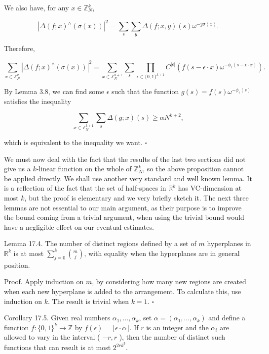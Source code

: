 \documentclass[10pt]{article}
\begin{document}
We also have, for any $x \in \mathbb{Z}_{N}^{k}$,

$$
\left|\Delta(f ; x)^{\wedge}(\sigma(x))\right|^{2}=\sum_{s} \sum_{y} \Delta(f ; x, y)(s) \omega^{-y \sigma(x)} .
$$

Therefore,

$$
\sum_{x \in \mathbb{Z}_{N}^{k}}\left|\Delta(f ; x)^{\wedge}(\sigma(x))\right|^{2}=\sum_{x \in \mathbb{Z}_{N}^{k+1}} \sum_{s} \prod_{\epsilon \in\{0,1\}^{k+1}} C^{|\epsilon|}\left(f(s-\epsilon \cdot x) \omega^{-\phi_{\epsilon}(s-\epsilon \cdot x)}\right) .
$$

By Lemma 3.8, we can find some $\epsilon$ such that the function $g(s)=f(s) \omega^{-\phi_{\epsilon}(s)}$ satisfies the inequality

$$
\sum_{x \in \mathbb{Z}_{N}^{k+1}} \sum_{s} \Delta(g ; x)(s) \geqslant \alpha N^{k+2},
$$

which is equivalent to the inequality we want. \(\square\)

We must now deal with the fact that the results of the last two sections did not give us a $k$-linear function on the whole of $\mathbb{Z}_{N}^{k}$, so the above proposition cannot be applied directly. We shall use another very standard and well known lemma. It is a reflection of the fact that the set of half-spaces in $\mathbb{R}^{k}$ has VC-dimension at most $k$, but the proof is elementary and we very briefly sketch it. The next three lemmas are not essential to our main argument, as their purpose is to improve the bound coming from a trivial argument, when using the trivial bound would have a negligible effect on our eventual estimates.

Lemma 17.4. The number of distinct regions defined by a set of $m$ hyperplanes in $\mathbb{R}^{k}$ is at most $\sum_{j=0}^{k}\binom{m}{j}$, with equality when the hyperplanes are in general position.

Proof. Apply induction on $m$, by considering how many new regions are created when each new hyperplane is added to the arrangement. To calculate this, use induction on $k$. The result is trivial when $k=1$. \(\square\)

Corollary 17.5. Given real numbers $\alpha_{1}, \ldots, \alpha_{k}$, set $\alpha=\left(\alpha_{1}, \ldots, \alpha_{k}\right)$ and define a function $f:\{0,1\}^{k} \rightarrow \mathbb{Z}$ by $f(\epsilon)=\lfloor\epsilon \cdot \alpha\rfloor$. If $r$ is an integer and the $\alpha_{i}$ are allowed to vary in the interval ( $-r, r$ ), then the number of distinct such functions that can result is at most $2^{2 r k^{3}}$.
\end{document}
